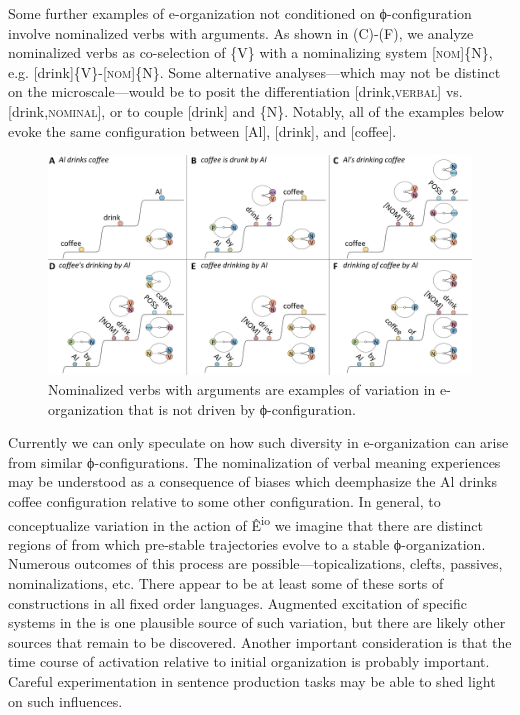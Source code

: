   Some further examples of e-organization not conditioned on ϕ-configuration involve nominalized verbs with arguments. As shown in {}(C)-(F), we analyze nominalized verbs as co-selection of \{V\} with a nominalizing system [\textsc{nom}]\{N\}, e.g. [drink]\{V\}-[\textsc{nom}]\{\textsc{N}\}. Some alternative analyses—which may not be distinct on the microscale—would be to posit the differentiation [drink,\textsc{verbal}] vs. [drink,\textsc{nominal}], or to couple [drink] and \{N\}. Notably, all of the examples below evoke the same  configuration between [Al], [drink], and [coffee].

  
\begin{figure}
\includegraphics[width=\textwidth]{figures/Tilsen-img82.png}
\caption{Nominalized verbs with arguments are examples of variation in e-organization that is not driven by ϕ-configuration.}
\label{fig:4:32}
\end{figure}
 

  Currently we can only speculate on how such diversity in e-organization can arise from similar ϕ-configurations. The nominalization of verbal meaning experiences may be understood as a consequence of  biases which deemphasize the {\textbar}Al drinks coffee{\textbar} configuration relative to some other configuration. In general, to conceptualize variation in the action of Ê\textsuperscript{io} we imagine that there are distinct regions of  from which pre-stable trajectories evolve to a stable ϕ-organization. Numerous outcomes of this process are possible—topicalizations, clefts, passives, nominalizations, etc. There appear to be at least some of these sorts of constructions in all fixed order languages. Augmented excitation of specific systems in the  is one plausible source of such variation, but there are likely other sources that remain to be discovered. Another important consideration is that the time course of activation relative to initial organization is probably important. Careful experimentation in sentence production tasks may be able to shed light on such influences.

